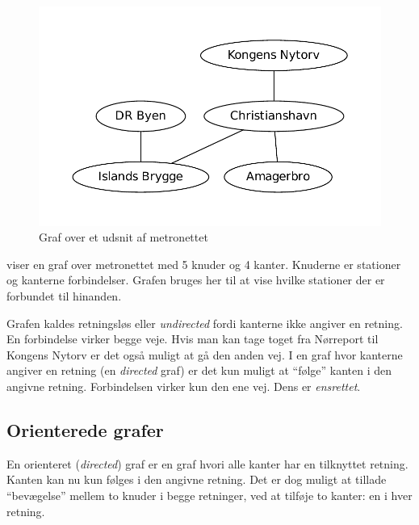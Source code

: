 \documentclass[10pt,a4paper,danish]{article}
\begin{document}
\begin{figure}[h]
\centering
\includegraphics[width=.75\textwidth]{graphs/metro0.pdf}
\caption{Graf over et udsnit af metronettet}
\label{fig:metro0}
\end{figure}

 viser en graf over metronettet med 5 knuder og 4
kanter. Knuderne er stationer og kanterne forbindelser. Grafen bruges
her til at vise hvilke stationer der er forbundet til hinanden.

Grafen kaldes retningsløs eller \textit{undirected} fordi kanterne
ikke angiver en retning. En forbindelse virker begge veje. Hvis man
kan tage toget fra Nørreport til Kongens Nytorv er det også muligt at
gå den anden vej. I en graf hvor kanterne angiver en retning (en
\textit{directed} graf) er det kun muligt at "`følge"' kanten i den
angivne retning. Forbindelsen virker kun den ene vej. Dens er
\textit{ensrettet}.

\subsection{Orienterede grafer}
En orienteret (\textit{directed}) graf er en graf hvori alle kanter
har en tilknyttet retning. Kanten kan nu kun følges i den angivne
retning. Det er dog muligt at tillade "`bevægelse"' mellem to knuder i
begge retninger, ved at tilføje to kanter: en i hver retning.
\end{document}
